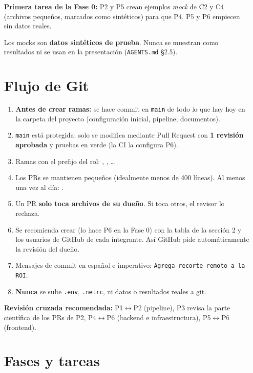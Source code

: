 \documentclass[11pt,a4paper]{article}
\newcommand{\ida}{\ensuremath{\leftrightarrow}}
\begin{document}
\textbf{Primera tarea de la Fase 0:} P2 y P5 crean ejemplos \emph{mock} de C2 y C4 (archivos pequeños, marcados como sintéticos) para
que P4, P5 y P6 empiecen sin datos reales.

\begin{nota}
Los mocks son \textbf{datos sintéticos de prueba}. Nunca se muestran como resultados ni se usan en la presentación (\texttt{AGENTS.md} §2.5).
\end{nota}

\section{Flujo de Git}

\begin{enumerate}
  \item \textbf{Antes de crear ramas:} se hace commit en \texttt{main} de todo lo que hay hoy en la carpeta del proyecto (configuración
        inicial, pipeline, documentos).
  \item \texttt{main} está protegida: solo se modifica mediante Pull Request con \textbf{1 revisión aprobada} y pruebas en verde (la CI
        la configura P6).
  \item Ramas con el prefijo del rol: , , \ldots
  \item Los PRs se mantienen pequeños (idealmente menos de 400 líneas). Al menos una vez al día: .
  \item Un PR \textbf{solo toca archivos de su dueño}. Si toca otros, el revisor lo rechaza.
  \item Se recomienda crear  (lo hace P6 en la Fase 0) con la tabla de la sección 2 y los usuarios de GitHub
        de cada integrante. Así GitHub pide automáticamente la revisión del dueño.
  \item Mensajes de commit en español e imperativo: \texttt{Agrega recorte remoto a la ROI}.
  \item \textbf{Nunca} se sube \texttt{.env}, \texttt{.netrc},  ni datos o resultados reales a git.
\end{enumerate}

\textbf{Revisión cruzada recomendada:} P1\ida{}P2 (pipeline), P3 revisa la parte científica de los PRs de P2, P4\ida{}P6 (backend e
infraestructura), P5\ida{}P6 (frontend).

\section{Fases y tareas}
\end{document}
